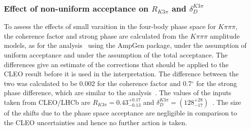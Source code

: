 
\subsubsection{Effect of non-uniform acceptance on $R_{K3\pi}$ and $\delta_D^{K3\pi}$}

To assess the effects of small varaition in the four-body phase space for $K\pi\pi\pi$, the coherence factor and strong phase are calculated from the $K\pi\pi\pi$ amplitude models, as for the  analysis~\cite{B2DK_ADSGLW} using the AmpGen package, under the assumption of uniform acceptance and under the assumption of the total \lhcb acceptance. The differences give an estimate of the corrections that should be applied to the CLEO result before it is used in the \lhcb interpretation. The difference between the two was calculated to be 0.002 for the coherence factor and 0.7$^{\circ}$ for the strong phase difference, which are similar to the  analysis~\cite{B2DK_ADSGLW}. The values of the inputs taken from CLEO/LHCb are $R_{K3\pi} = 0.43^{+0.17}_{-0.13}$ and $\delta_D^{K3\pi} = \left(128^{+28}_{-17}\right)$~\cite{charmk3pi}. The size of the shifts due to the \lhcb phase space acceptance are negligible in comparison to the CLEO uncertainties and hence no further action is taken.

